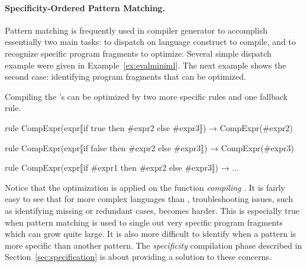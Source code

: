 \paragraph{Specificity-Ordered Pattern Matching.} Pattern matching is
frequently used in compiler generator to accomplish essentially two
main tasks: to dispatch on language construct to compile, and to
recognize specific program fragments to optimize. Several simple
dispatch example were given in Example~\ref{ex:evalminiml}. The
next example shows the second case: identifying program fragments
that can be optimized.
%
\begin{example} Compiling the \MiniML's 
can be optimized by two more specific rules 
and one fallback rule.
   
\begin{lstTosca}
rule CompExpr(expr⟦if true then #expr2 else #expr3⟧) 
  → CompExpr(#expr2)

rule CompExpr(expr⟦if false then #expr2 else #expr3⟧) 
  → CompExpr(#expr3)

rule CompExpr(expr⟦if #expr1 then #expr2 else #expr3⟧) 
  → ...
\end{lstTosca}	
\end{example}
%
Notice that the optimization is applied on the function 
\emph{compiling} \MiniML.   
%
It is fairly easy to see that for more complex languages than \MiniML, troubleshooting issues, 
such as identifying missing or redundant cases, becomes harder. This is especially true when 
pattern matching is used to single out very specific program fragments which can grow quite large. 
It is also more difficult to identify when a pattern is more specific than another pattern. 
The \emph{specificity} compilation phase described in Section~\ref{sec:specification} 
is about providing a solution to these concerns.


